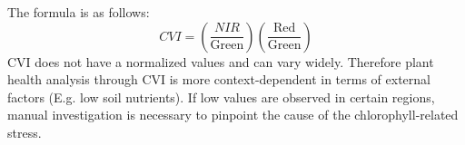 The formula is as follows:
\begin{equation}
    CVI = \left(\frac{NIR}{\text{Green}}\right)\left(\frac{\text{Red}}{\text{Green}}\right)
    \label{eq:cvi}
\end{equation}
CVI does not have a normalized values and can vary widely. Therefore plant health analysis through CVI is more context-dependent in terms of external factors (E.g. low soil nutrients). If low values are observed in certain regions, manual investigation is necessary to pinpoint the cause of the chlorophyll-related stress\cite{CVI}.
